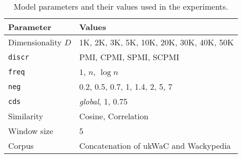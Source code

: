 \begin{table}
  \centering
  \begin{tabular}{ll}
    \toprule
    Parameter & Values \\
    \midrule
    Dimensionality $D$ & 1K, 2K, 3K, 5K, 10K, 20K, 30K, 40K, 50K \\
    \texttt{discr} & PMI, CPMI, SPMI, SCPMI \\
    \texttt{freq} & $1$, $n$, $\log n$ \\
    \texttt{neg} & 0.2, 0.5, 0.7, 1, 1.4, 2, 5, 7 \\
    \texttt{cds} & \textit{global}, 1, 0.75 \\
    Similarity & Cosine, Correlation \\
    Window size & 5                                \\
    Corpus & Concatenation of ukWaC and Wackypedia \\
    \bottomrule
  \end{tabular}
  \caption{Model parameters and their values used in the experiments.}
\label{tab:parameters}
\end{table}

